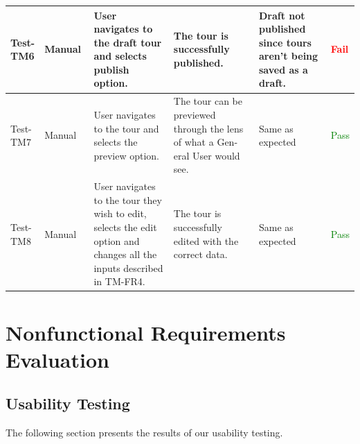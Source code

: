 \documentclass[12pt, titlepage]{article}
\begin{document}
\begin{table}[H]
{\begin{tabular}{|l|p{0.15\linewidth}|p{0.3\linewidth}|p{0.3\linewidth}|p{0.3\linewidth}|p{0.1\linewidth}|}
        \hline
      Test-TM6                           & Manual                            & User navigates to the draft tour and selects publish option. & The tour is successfully published.                        & Draft not published since tours aren't being saved as a draft.                               & \textcolor{Red}{Fail}               \\
      \hline
    Test-TM7                           & Manual                            & User navigates to the tour and selects the preview option. & The tour can be previewed through the lens of what a Gen-
eral User would see.                        & Same as expected                             & \textcolor{Green}{Pass}               \\
      \hline
      Test-TM8                           & Manual                            & User navigates to the tour they wish to edit, selects the edit
option and changes all the inputs described in TM-FR4. & The tour is successfully edited with the correct data.                     & Same as expected                             & \textcolor{Green}{Pass}               \\
      \hline
    \end{tabular}}
  \label{table:GR5}
\end{table}

\restoregeometry
\section{Nonfunctional Requirements Evaluation}

\subsection{Usability Testing}
The following section presents the results of our usability testing.
\end{document}
